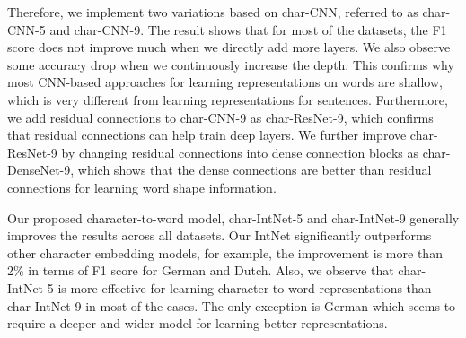 \documentclass[11pt,a4paper]{article}
\begin{document}
Therefore, we implement two variations based on char-CNN, referred to as char-CNN-5 and char-CNN-9. The result shows that for most of the datasets, the F1 score does not improve much when we directly add more layers. We also observe some accuracy drop when we continuously increase the depth. This confirms why most CNN-based approaches for learning representations on words are shallow, which is very different from learning representations for sentences. Furthermore, we add residual connections to char-CNN-9 as char-ResNet-9, which confirms that residual connections can help train deep layers. We further improve char-ResNet-9 by changing residual connections into dense connection blocks as char-DenseNet-9, which shows that the dense connections are better than residual connections for learning word shape information.

Our proposed character-to-word model, char-IntNet-5 and char-IntNet-9 generally improves the results across all datasets. Our IntNet significantly outperforms other character embedding models, for example, the improvement is more than 2\% in terms of F1 score for German and Dutch. Also, we observe that char-IntNet-5 is more effective for learning character-to-word representations than char-IntNet-9 in most of the cases. The only exception is German which seems to require a deeper and wider model for learning better representations.
\end{document}
